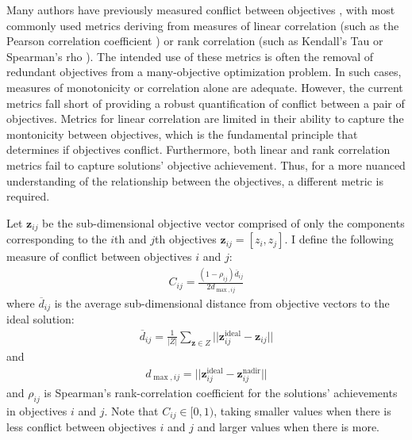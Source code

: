 Many authors have previously measured conflict between objectives \cite{brockhoff2009objective}\cite{purshouse2003conflict}\cite{gal1977redundant}, with most commonly used metrics deriving from measures of linear correlation (such as the Pearson correlation coefficient \cite{deb2006searching}) or rank correlation (such as Kendall's Tau \cite{kanoulas2009empirical} or Spearman's rho \cite{karande2012application}%
). The intended use of these metrics is often the removal of redundant objectives from a many-objective optimization problem. In such cases, measures of monotonicity or correlation alone are adequate. However, the current metrics fall short of providing a robust quantification of conflict between a pair of objectives. Metrics for linear correlation are limited in their ability to capture the montonicity between objectives, which is the fundamental principle that determines if objectives conflict. Furthermore, both linear and rank correlation metrics fail to capture solutions' objective achievement. Thus, for a more nuanced understanding of the relationship between the objectives, a different metric is required.

Let $\mathbf{z}_{ij}$ be the sub-dimensional objective vector comprised of only the components corresponding to the $i$th and $j$th objectives $\mathbf{z}_{ij} = [z_i,z_j]$. I define the following measure of conflict between objectives $i$ and $j$:
\begin{align}
C_{ij} = \frac{(1-\rho_{ij})\overbar{d}_{ij}}{2 d_{\max,ij}} \label{eqn:defConflict}
\end{align}
where $\overbar{d}_{ij}$ is the average sub-dimensional distance from objective vectors to the ideal solution:
\begin{align}
\overbar{d}_{ij} = \frac{1}{|Z|} \sum_{\mathbf{z} \in Z} ||\mathbf{z}^{\text{ideal}}_{ij} - \mathbf{z}_{ij}||
\end{align}
and
\begin{align}
d_{\max,ij} = ||\mathbf{z}^{\text{ideal}}_{ij} - \mathbf{z}^{\text{nadir}}_{ij}||
\end{align}
and $\rho_{ij}$ is Spearman's rank-correlation coefficient for the solutions' achievements in objectives $i$ and $j$. Note that $C_{ij} \in [0,1)$, taking smaller values when there is less conflict between objectives $i$ and $j$ and larger values when there is more.

